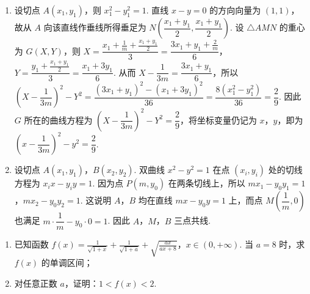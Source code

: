 \begin{solution}
\begin{enumerate}
\item 设切点 \(A\left(x_1,y_1\right)\)，则 \(x_1^2-y_1^2=1\). 直线 \(x-y=0\) 的方向向量为 \((1,1)\)，故从 \(A\) 向该直线作垂线所得垂足为 \(N\left(\dfrac{x_1+y_1}{2},\dfrac{x_1+y_1}{2}\right)\). 设 \(\triangle AMN\) 的重心为 \(G(X,Y)\)，则
\(X=\dfrac{x_1+\frac{1}{m}+\frac{x_1+y_1}{2}}{3}=\dfrac{3x_1+y_1+\frac{2}{m}}{6}\)，\(Y=\dfrac{y_1+\frac{x_1+y_1}{2}}{3}=\dfrac{x_1+3y_1}{6}\). 从而 \(X-\dfrac{1}{3m}=\dfrac{3x_1+y_1}{6}\)，所以
\(\left(X-\dfrac{1}{3m}\right)^2-Y^2=\dfrac{(3x_1+y_1)^2-(x_1+3y_1)^2}{36}=\dfrac{8(x_1^2-y_1^2)}{36}=\dfrac{2}{9}\). 因此 \(G\) 所在的曲线方程为 \(\left(X-\dfrac{1}{3m}\right)^2-Y^2=\dfrac{2}{9}\)，将坐标变量仍记为 \(x\)，\(y\)，即为 \(\left(x-\dfrac{1}{3m}\right)^2-y^2=\dfrac{2}{9}\).

\item 设切点 \(A\left(x_1,y_1\right)\)，\(B\left(x_2,y_2\right)\). 双曲线 \(x^2-y^2=1\) 在点 \(\left(x_i,y_i\right)\) 处的切线方程为 \(x_i x-y_i y=1\). 因为点 \(P(m,y_0)\) 在两条切线上，所以
\(mx_1-y_0y_1=1\)，\(mx_2-y_0y_2=1\). 这说明 \(A\)，\(B\) 均在直线 \(mx-y_0y=1\) 上，而点 \(M\left(\dfrac{1}{m},0\right)\) 也满足 \(m\cdot\dfrac{1}{m}-y_0\cdot0=1\). 因此 \(A\)，\(M\)，\(B\) 三点共线.
\end{enumerate}
\end{solution}

\begin{problem}
\begin{enumerate}
\item 已知函数 \(f(x) = \frac{1}{\sqrt{1 + x}} + \frac{1}{\sqrt{1 + a}} + \sqrt{\frac{ax}{ax + 8}}\)，\(x \in (0, +\infty)\). 当 \(a = 8\) 时，求 \(f(x)\) 的单调区间；
\item 对任意正数 \(a\)，证明：\(1 < f(x) < 2\).
\end{enumerate}
\end{problem}

